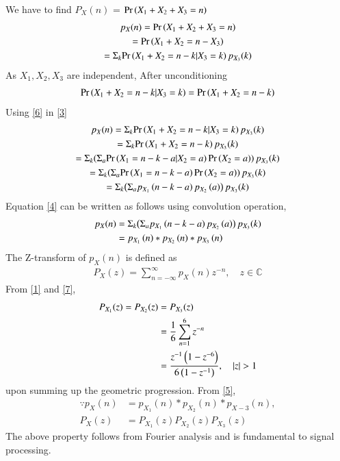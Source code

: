 \documentclass[journal,12pt,twocolumn]{IEEEtran}
\begin{document}
We have to find $P_X(n)$ = $\Pr\left(X_1+X_2+X_3=n\right)$
\begin{multline}
    p_X(n)=\Pr\left(X_1+X_2+X_3=n\right)\\
   =\Pr\left(X_1+X_2=n-X_3\right)\\
    =\Sigma_{k}{\Pr\left(X_1+X_2=n-k|X_3=k\right)p_{X_3}(k)}\label{3}
\end{multline}
As $X_1,X_2,X_3$ are independent, After unconditioning
\begin{align}
    \Pr\left(X_1+X_2=n-k|X_3=k\right)=\Pr\left(X_1+X_2=n-k\right)\label{6}
\end{align}
Using \eqref{6} in \eqref{3}
\begin{multline}
    p_X(n)=\Sigma_{k}{\Pr\left(X_1+X_2=n-k|X_3=k\right)p_{X_3}(k)}\\
    =\Sigma_{k}{\Pr\left(X_1+X_2=n-k\right)p_{X_3}(k)}\\
    =\Sigma_{k}{\left(\Sigma_{a}{\Pr\left(X_1=n-k-a|X_2=a\right)\Pr\left(X_2=a\right)}\right)p_{X_3}(k)}\\
    =\Sigma_{k}{\left(\Sigma_{a}{\Pr\left(X_1=n-k-a\right)\Pr\left(X_2=a\right)}\right)p_{X_3}(k)}\\
    =\Sigma_{k}{\left(\Sigma_{a}{p_{X_1}\left(n-k-a\right)p_{X_2}\left(a\right)}\right)p_{X_3}(k)}\label{4}
\end{multline}
Equation \eqref{4} can be written as follows using convolution operation,
\begin{align}
    \nonumber p_X(n)&=\Sigma_{k}{\left(\Sigma_{a}{p_{X_1}\left(n-k-a\right)p_{X_2}\left(a\right)}\right)p_{X_3}(k)}\\
    &=p_{X_1}\left(n\right)*p_{X_2}\left(n\right)*p_{X_3}\left(n\right)\label{5}
\end{align}
The Z-transform of $p_X(n)$ is defined as
\begin{align}
P_X(z) = \sum_{n = -\infty}^{\infty}p_X(n)z^{-n}, \quad z \in \mathbb{C}
\label{7}
\end{align}
%
From \eqref{1} and \eqref{7}, 
\begin{align}
\nonumber P_{X_1}(z) =P_{X_2}(z)&=P_{X_3}(z)\\
&= \frac{1}{6}\sum_{n = 1}^{6}z^{-n}
\\
&=\frac{z^{-1}\left(1-z^{-6}\right)}{6\left(1-z^{-1}\right)}, \quad \vert z\vert > 1
\label{8}
\end{align}
upon summing up the geometric progression. 
From \eqref{5},
\begin{align}
\because p_X(n) &= p_{X_1}(n)*p_{X_2}(n)*p_{X-3}(n),
\\
P_X(z) &= P_{X_1}(z) P_{X_2}(z)P_{X_3}(z)
\label{9}
\end{align}
The above property follows from Fourier analysis and is fundamental to signal processing.\\
\end{document}
